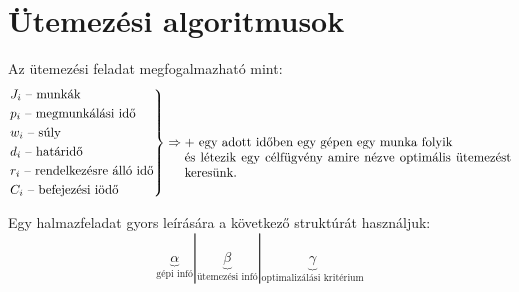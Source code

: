 \skiptooddpage
\section{Ütemezési algoritmusok}

Az ütemezési feladat megfogalmazható mint:
\[
	\begin{rcases}
		J_i \mbox{ -- munkák}                 \\
		p_i \mbox{ -- megmunkálási idő}       \\
		w_i \mbox{ -- súly}                   \\
		d_i \mbox{ -- határidő}               \\
		r_i \mbox{ -- rendelkezésre álló idő} \\
		C_i \mbox{ -- befejezési iödő}        \\
	\end{rcases}
	\Rightarrow
	\parbox[t]{9cm}{ $+$ egy adott időben egy gépen egy munka folyik \\
		és létezik egy célfügvény amire nézve optimális ütemezést keresünk.}
\]

Egy halmazfeladat gyors leírására a következő struktúrát használjuk:
\[
	\underbrace{\alpha}_{\mbox{gépi infó}} | \underbrace{\beta}_{\mbox{ütemezési infó}
	} | \underbrace{\gamma}_{\mbox{optimalizálási kritérium}}
\]

